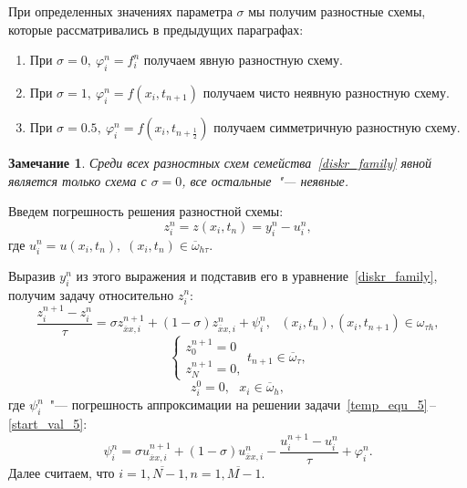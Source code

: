 \documentclass[11pt,a4paper,twoside,listtotoc,bibtotoc]{report}
\numberwithin{equation}{section}
\theoremstyle{definition}
\theoremstyle{plain}
\newtheorem*{note*}{Замечание}
\begin{document}
\noindent
При определенных значениях параметра $\sigma$ мы получим разностные схемы,
которые рассматривались в предыдущих параграфах:
%
\begin{enumerate}
%
    \item
    При $\sigma = 0, ~\varphi_i^n = f_i^n$ получаем явную разностную схему.
    \item
    При $\sigma = 1, ~\varphi_i^n = f(x_i,t_{n+1})$ получаем чисто неявную
    разностную схему.
    \item
    При $\sigma = 0.5, ~\varphi_i^n = f(x_i,t_{n + \frac12})$ получаем симметричную
    разностную схему.
%
\end{enumerate}
%
\begin{note*}
%
    Среди всех разностных схем семейства~\eqref{diskr_family} явной является только
    схема с $\sigma = 0$, все остальные~"--- неявные.
%
\end{note*}
%
Введем погрешность решения разностной схемы:
%
$$
    z_i^n = z(x_i, t_n) = y_i^n - u_i^n,
$$
%
где $u_i^n = u(x_i, t_n),\;(x_i, t_n) \in \overline{\omega}_{h \tau}.$

Выразив $y_i^n$ из этого выражения и подставив его в уравнение~\eqref{diskr_family},
получим задачу относительно $z_i^n$:
\begin{equation}
    \label{z_eq_5}
    \frac{z_i^{n+1} - z_i^n}{\tau} = \sigma z^{n+1}_{\overline{x}x,i} + (1 - \sigma)
    z^{n}_{\overline{x}x,i} + \psi_i^n,~~~(x_i, t_n), (x_i, t_{n+1})\in \omega_{\tau h},
\end{equation}
%
\begin{equation}
    \label{z_board_5}
    \begin{cases}
        z_0^{n+1} = 0 \\
        z_N^{n+1} = 0,
    \end{cases}
    t_{n+1}\in \overline{\omega}_{\tau},
\end{equation}
%
\begin{equation}
    \label{z_start_5}
    z_i^0 = 0,~~~x_i\in \overline{\omega}_h,
\end{equation}
%
где $\psi_i^n$~"--- погрешность аппроксимации на решении
задачи~\eqref{temp_equ_5}\,--\,\eqref{start_val_5}:
%
\begin{equation}
%
    \label{approx_temp_5}
    \psi_i^n = \sigma u_{\overline{x}x,i}^{n+1} + (1-\sigma) u_{\overline{x}x,i}^n -
    \dfrac{u_i^{n+1} - u_i^n}{\tau} + \varphi_i^n.
%
\end{equation}
%
Далее считаем, что $i=\overline{1,N-1}, n=\overline{1,M-1}$.
\end{document}

